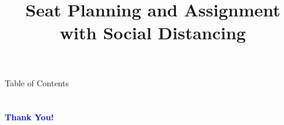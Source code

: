 \documentclass[aspectratio=43]{beamer}
\title{Seat Planning and Assignment with Social Distancing} %
\subtitle{}
\institute[HKUST]{
    IEDA%
    \\%
    The Hong Kong University of Science and Technology%
} %
\date{}
\begin{document}
    \frame{\titlepage}
    \begin{frame}{Table of Contents}
        \tableofcontents
    \end{frame}
    
    
    
    
    
    
    
    
    

    \section{}
    \begin{frame}{}
        \centering
            \Huge\bfseries
        \textcolor{blue}{Thank You!}
    \end{frame}
\end{document}
